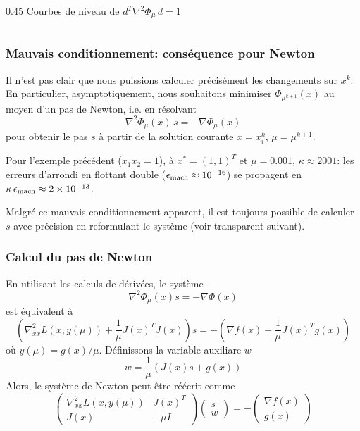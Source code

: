 \documentclass[t,usepdftitle=false,aspectratio=169]{beamer}
\begin{document}
\begin{frame}
\begin{columns}[T]
\begin{column}{0.45\textwidth}
{\small\centering Courbes de niveau de $d^T\nabla^2\Phi_\mu\, d=1$}
\end{column}
\end{columns}

\end{frame}

\begin{frame}
\frametitle{Mauvais conditionnement: conséquence pour Newton}

Il n'est pas clair que nous puissions calculer précisément les changements sur $x^k$.
En particulier, asymptotiquement, nous souhaitons minimiser $\Phi_{\mu^{k+1}}(x)$ au moyen d'un pas de Newton, i.e. en résolvant
$$
\nabla^2 \Phi_{\mu}(x)\, s = -\nabla \Phi_{\mu}(x)
$$
pour obtenir le pas $s$ à partir de la solution courante $x = x_i^k$, $\mu = \mu^{k+1}$.

\mbox{}

Pour l'exemple précédent ($x_1x_2=1$), à $x^* = (1,1)^T$ et $\mu = 0.001$, $\kappa \approx 2001$: les erreurs d'arrondi en flottant double ($\epsilon_{\rm mach} \approx 10^{-16}$) se propagent en $\kappa\,\epsilon_{\rm mach} \approx 2\times 10^{-13}$.

\mbox{}

Malgré ce mauvais conditionnement apparent, il est toujours possible de calculer $s$ avec précision en reformulant le système (voir transparent suivant).

\end{frame}

\begin{frame}
\frametitle{Calcul du pas de Newton}

En utilisant les calculs de dérivées, le système
$$
\nabla^2 \Phi_{\mu}(x) s = -\nabla \Phi(x)
$$
est équivalent à
$$
\left( \nabla^2_{xx} L(x, y(\mu)) + \frac{1}{\mu} J(x)^TJ(x) \right) s = - \left( \nabla f(x) + \frac{1}{\mu} J(x)^T g(x) \right)
$$
où $y(\mu) = g(x)/\mu$.
Définissons la variable auxiliare $w$
$$
w = \frac{1}{\mu} \left( J(x)s + g(x) \right)
$$
Alors, le système de Newton peut être réécrit comme
$$
\begin{pmatrix}
\nabla^2_{xx} L(x, y(\mu)) & J(x)^T \\
J(x) & -\mu I
\end{pmatrix}
\begin{pmatrix}
s \\ w
\end{pmatrix}
=
- \begin{pmatrix}
\nabla f(x) \\ g(x)
\end{pmatrix}
$$

\end{frame}
\end{document}
